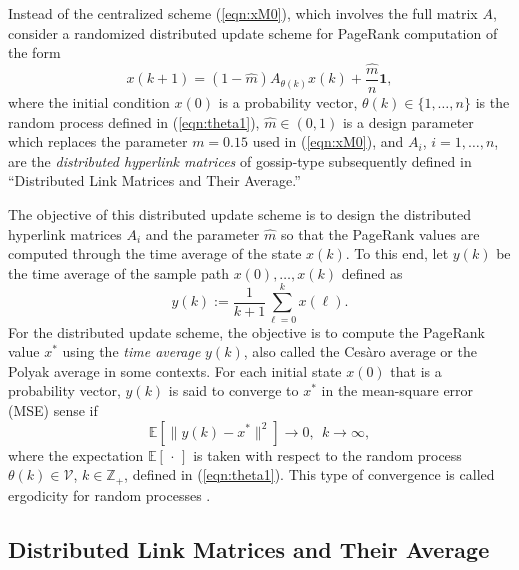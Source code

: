 \documentclass[11pt,draftcls,onecolumn]{IEEEtran}
\newcommand{\field}[1]{{\mathbb{#1}}}
\newcommand{\one}{\mathbf{1}}
\newcommand{\Z}{\field{Z}}
\newcommand{\E}{\field{E}}
\begin{document}
Instead of the centralized scheme (\ref{eqn:xM0}), which involves the full matrix $A$, 
consider a randomized distributed update scheme for PageRank computation of the form
\begin{equation}
  x(k+1) 
    = (1-\hat{m}) A_{\theta(k)} x(k) 
        + \frac{\hat{m}}{n}\one,
  \label{eqn:xMi1}
\end{equation}
where the initial condition $x(0)$ is a probability vector, $\theta(k)\in\{1,\ldots,n\}$ is 
the random process defined in (\ref{eqn:theta1}), $\hat{m}\in(0,1)$ is a design parameter 
which replaces the parameter $m=0.15$ used in (\ref{eqn:xM0}), and 
$A_i$, $i=1,\ldots,n$, are the {\it distributed hyperlink matrices} of gossip-type subsequently 
defined in ``Distributed Link Matrices and Their Average.''




The objective of this distributed update scheme 
is to design the distributed hyperlink matrices $A_i$ and the parameter $\hat{m}$
so that the PageRank values are computed
through the time average of the state $x(k)$. To this end, let $y(k)$ be the time average of 
the sample path $x(0),\ldots,x(k)$ defined as
\begin{equation}
y(k) 
:= \frac{1}{k+1}\sum_{\ell=0}^{k} x(\ell).
\label{eqn:yk}
\end{equation}
For the distributed update scheme, the objective is to compute the PageRank value $x^*$ using 
the {\it time average} $y(k)$, also called the Ces\`aro average or the Polyak average in some contexts.
For each initial state $x(0)$ that is a probability vector, 
$y(k)$ is said to converge to $x^*$ in the mean-square error (MSE) sense if
\begin{equation*}
\E\left[
   \bigl\|
      y(k) - x^*
   \bigr\|^2
  \right] \rightarrow 0,~~k\rightarrow\infty,
 \label{eqn:thm:erg}
\end{equation*}
where the expectation $\E[\,\cdot\,]$ is taken with respect to the random process
$\theta(k)\in\mathcal{V}$, $k\in\Z_+$, defined in (\ref{eqn:theta1}).
This type of convergence is called ergodicity for random processes \cite{PapPil:02}.

\subsection*{Distributed Link Matrices and Their Average}
\end{document}

